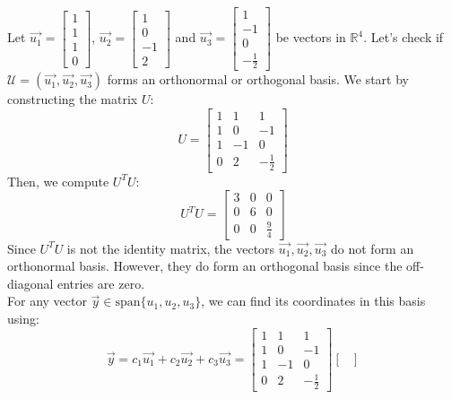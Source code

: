 \begin{eg}
    Let $\vec{u_1} = \begin{bmatrix}
        1 \\ 1 \\ 1 \\ 0
    \end{bmatrix}$, $\vec{u_2} = \begin{bmatrix}
        1 \\ 0 \\ -1 \\ 2
    \end{bmatrix}$ and $\vec{u_3} = \begin{bmatrix}
        1 \\ -1 \\ 0 \\ - \frac{1}{2}
    \end{bmatrix}$ be vectors in $\mathbb{R}^4$. Let's check if $\mathcal{U} = (\vec{u_1}, \vec{u_2}, \vec{u_3})$ forms an orthonormal or orthogonal basis. We start by constructing the matrix $U$:
    \[
        U = \begin{bmatrix}
            1 & 1 & 1 \\
            1 & 0 & -1 \\
            1 & -1 & 0 \\
            0 & 2 & -\frac{1}{2}
        \end{bmatrix}
    \]
    Then, we compute $U^T U$:
    \[
        U^T U = \begin{bmatrix}
            3 & 0 & 0 \\
            0 & 6 & 0 \\
            0 & 0 & \frac{9}{4}
        \end{bmatrix}
    \]
    Since $U^T U$ is not the identity matrix, the vectors $\vec{u_1}, \vec{u_2}, \vec{u_3}$ do not form an orthonormal basis. However, they do form an orthogonal basis since the off-diagonal entries are zero. \\
    For any vector $\vec{y} \in \text{span}\{u_1, u_2, u_3\}$, we can find its coordinates in this basis using:
    \[
        \vec{y} = c_1 \vec{u_1} + c_2 \vec{u_2} + c_3 \vec{u_3} = \begin{bmatrix}
            1 & 1 & 1 \\
            1 & 0 & -1 \\
            1 & -1 & 0 \\
            0 & 2 & -\frac{1}{2}
        \end{bmatrix} \begin{bmatrix}

\end{bmatrix}\]
\end{eg}
